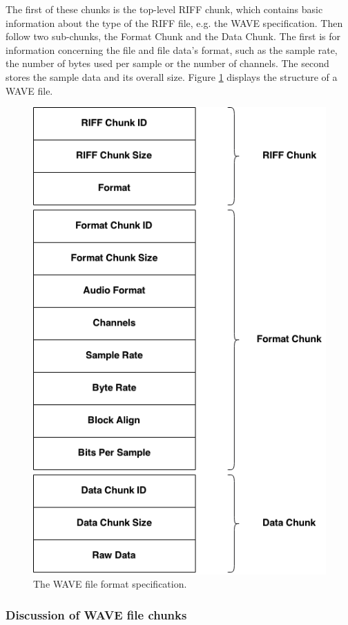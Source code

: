 \documentclass[12pt,twoside]{report}
\begin{document}
\noindent The first of these chunks is the top-level RIFF chunk, which contains basic information about the type of the RIFF file, e.g. the WAVE specification. Then follow two sub-chunks, the Format Chunk and the Data Chunk. The first is for information concerning the file and file data's format, such as the sample rate, the number of bytes used per sample or the number of channels. The second stores the sample data and its overall size. Figure \ref{fig:wave} displays the structure of a WAVE file.

\begin{figure}[p!]
  \includegraphics[scale=0.7]{img/wave}
  \caption{The WAVE file format specification.}
  \label{fig:wave}
\end{figure}

\pagebreak

\subsubsection{Discussion of WAVE file chunks}
\end{document}
